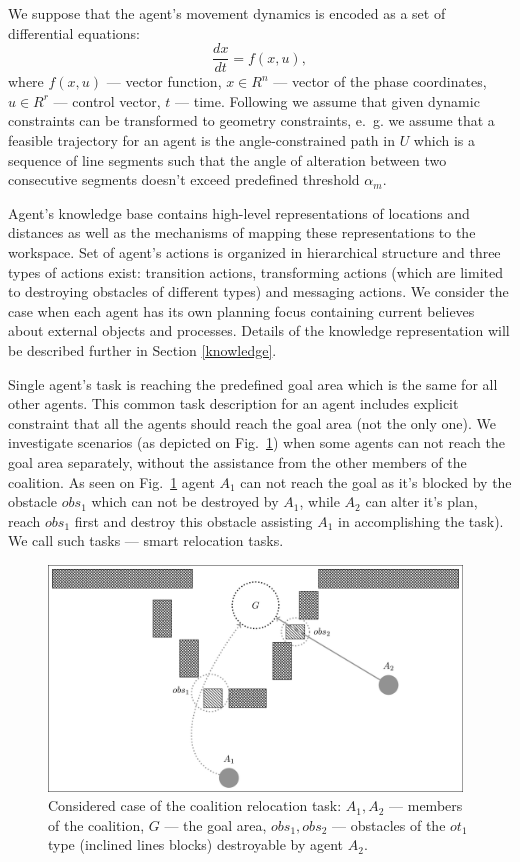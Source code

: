 \documentclass[runningheads,a4paper]{llncs}
\begin{document}
We suppose that the agent's movement dynamics is encoded as a set of differential equations:
\begin{equation}
	\frac{dx}{dt} = f(x,u),
\end{equation}
where $f(x,u)$ --- vector function, $x\in R^n$ --- vector of the phase coordinates, $u\in R^r$ --- control vector, $t$ --- time. Following \cite{Yakovlev2015a} we assume that given dynamic constraints can be transformed to geometry constraints, e.~g. we assume that a feasible trajectory for an agent is the angle-constrained path in $U$ which is a sequence of line segments such that the angle of alteration between two consecutive segments doesn't exceed predefined threshold $\alpha_m$.

Agent's knowledge base contains high-level representations of locations and distances as well as the mechanisms of mapping these representations to the workspace. Set of agent's actions is organized in hierarchical structure and three types of actions exist: transition actions, transforming actions (which are limited to destroying obstacles of different types) and messaging actions. We consider the case when each agent has its own planning focus containing current believes about external objects and processes. Details of the knowledge representation will be described further in Section \ref{knowledge}.

Single agent's task is reaching the predefined goal area which is the same for all other agents. This common task description for an agent includes explicit constraint that all the agents should reach the goal area (not the only one). We investigate scenarios (as depicted on Fig.~\ref{fig:case}) when some agents can not reach the goal area separately, without the assistance from the other members of the coalition. As seen on Fig.~\ref{fig:case} agent $A_1$ can not reach the goal as it's blocked by the obstacle $obs_1$ which can not be destroyed by $A_1$, while $A_2$ can alter it's plan, reach $obs_1$ first and destroy this obstacle assisting $A_1$ in accomplishing the task). We call such tasks --- smart relocation tasks.

\begin{figure}
	\centering
	\includegraphics[height=6cm]{rita_example}
	\caption{Considered case of the coalition relocation task: $A_1,A_2$ --- members of the coalition, $G$ --- the goal area, $obs_1, obs_2$ --- obstacles of the $ot_1$ type (inclined lines blocks) destroyable by agent $A_2$.}
	\label{fig:case}
\end{figure}
\end{document}
